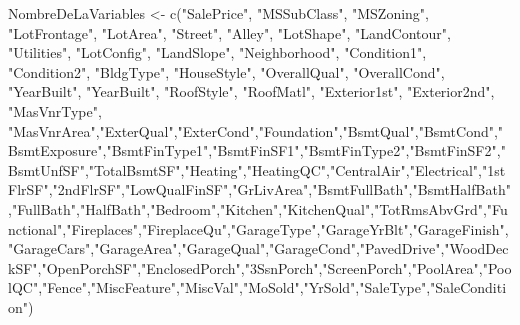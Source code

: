 \documentclass[
]{article}
\newenvironment{Shaded}{\begin{snugshade}}{\end{snugshade}}
\newcommand{\FunctionTok}[1]{\textcolor[rgb]{0.00,0.00,0.00}{#1}}
\newcommand{\NormalTok}[1]{#1}
\newcommand{\OtherTok}[1]{\textcolor[rgb]{0.56,0.35,0.01}{#1}}
\newcommand{\StringTok}[1]{\textcolor[rgb]{0.31,0.60,0.02}{#1}}
\begin{document}
\begin{Shaded}
\begin{Highlighting}[]
\NormalTok{NombreDeLaVariables }\OtherTok{\textless{}{-}} \FunctionTok{c}\NormalTok{(}\StringTok{"SalePrice"}\NormalTok{, }\StringTok{"MSSubClass"}\NormalTok{, }\StringTok{"MSZoning"}\NormalTok{, }\StringTok{"LotFrontage"}\NormalTok{, }\StringTok{"LotArea"}\NormalTok{, }\StringTok{"Street"}\NormalTok{, }\StringTok{"Alley"}\NormalTok{, }\StringTok{"LotShape"}\NormalTok{, }\StringTok{"LandContour"}\NormalTok{, }\StringTok{"Utilities"}\NormalTok{, }\StringTok{"LotConfig"}\NormalTok{, }\StringTok{"LandSlope"}\NormalTok{, }\StringTok{"Neighborhood"}\NormalTok{, }\StringTok{"Condition1"}\NormalTok{, }\StringTok{"Condition2"}\NormalTok{, }\StringTok{"BldgType"}\NormalTok{, }\StringTok{"HouseStyle"}\NormalTok{, }\StringTok{"OverallQual"}\NormalTok{, }\StringTok{"OverallCond"}\NormalTok{, }\StringTok{"YearBuilt"}\NormalTok{, }\StringTok{"YearBuilt"}\NormalTok{, }\StringTok{"RoofStyle"}\NormalTok{, }\StringTok{"RoofMatl"}\NormalTok{, }\StringTok{"Exterior1st"}\NormalTok{, }\StringTok{"Exterior2nd"}\NormalTok{, }\StringTok{"MasVnrType"}\NormalTok{, }\StringTok{"MasVnrArea"}\NormalTok{,}\StringTok{"ExterQual"}\NormalTok{,}\StringTok{"ExterCond"}\NormalTok{,}\StringTok{"Foundation"}\NormalTok{,}\StringTok{"BsmtQual"}\NormalTok{,}\StringTok{"BsmtCond"}\NormalTok{,}\StringTok{"BsmtExposure"}\NormalTok{,}\StringTok{"BsmtFinType1"}\NormalTok{,}\StringTok{"BsmtFinSF1"}\NormalTok{,}\StringTok{"BsmtFinType2"}\NormalTok{,}\StringTok{"BsmtFinSF2"}\NormalTok{,}\StringTok{"BsmtUnfSF"}\NormalTok{,}\StringTok{"TotalBsmtSF"}\NormalTok{,}\StringTok{"Heating"}\NormalTok{,}\StringTok{"HeatingQC"}\NormalTok{,}\StringTok{"CentralAir"}\NormalTok{,}\StringTok{"Electrical"}\NormalTok{,}\StringTok{"1stFlrSF"}\NormalTok{,}\StringTok{"2ndFlrSF"}\NormalTok{,}\StringTok{"LowQualFinSF"}\NormalTok{,}\StringTok{"GrLivArea"}\NormalTok{,}\StringTok{"BsmtFullBath"}\NormalTok{,}\StringTok{"BsmtHalfBath"}\NormalTok{,}\StringTok{"FullBath"}\NormalTok{,}\StringTok{"HalfBath"}\NormalTok{,}\StringTok{"Bedroom"}\NormalTok{,}\StringTok{"Kitchen"}\NormalTok{,}\StringTok{"KitchenQual"}\NormalTok{,}\StringTok{"TotRmsAbvGrd"}\NormalTok{,}\StringTok{"Functional"}\NormalTok{,}\StringTok{"Fireplaces"}\NormalTok{,}\StringTok{"FireplaceQu"}\NormalTok{,}\StringTok{"GarageType"}\NormalTok{,}\StringTok{"GarageYrBlt"}\NormalTok{,}\StringTok{"GarageFinish"}\NormalTok{,}\StringTok{"GarageCars"}\NormalTok{,}\StringTok{"GarageArea"}\NormalTok{,}\StringTok{"GarageQual"}\NormalTok{,}\StringTok{"GarageCond"}\NormalTok{,}\StringTok{"PavedDrive"}\NormalTok{,}\StringTok{"WoodDeckSF"}\NormalTok{,}\StringTok{"OpenPorchSF"}\NormalTok{,}\StringTok{"EnclosedPorch"}\NormalTok{,}\StringTok{"3SsnPorch"}\NormalTok{,}\StringTok{"ScreenPorch"}\NormalTok{,}\StringTok{"PoolArea"}\NormalTok{,}\StringTok{"PoolQC"}\NormalTok{,}\StringTok{"Fence"}\NormalTok{,}\StringTok{"MiscFeature"}\NormalTok{,}\StringTok{"MiscVal"}\NormalTok{,}\StringTok{"MoSold"}\NormalTok{,}\StringTok{"YrSold"}\NormalTok{,}\StringTok{"SaleType"}\NormalTok{,}\StringTok{"SaleCondition"}\NormalTok{)}


\end{Highlighting}
\end{Shaded}
\end{document}
